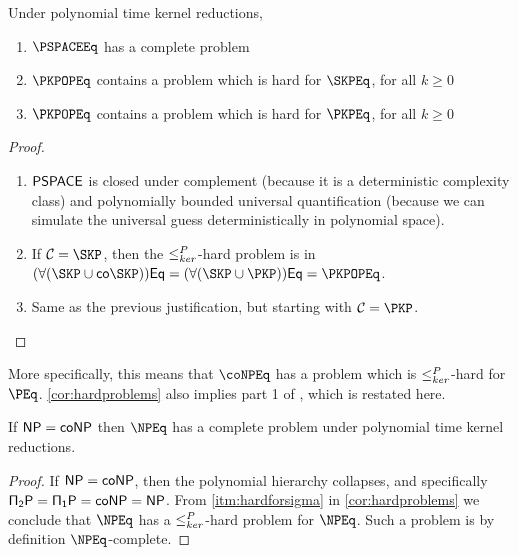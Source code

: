 \begin{corollary}\label{cor:hardproblems}
  Under polynomial time kernel reductions,
  \begin{enumerate}
  \item $\PSPACEEq$ has a complete problem
  \item\label{itm:hardforsigma} $\PKPOPEq$ contains a problem which is hard for $\SKPEq$, for all $k\geq 0$
  \item $\PKPOPEq$ contains a problem which is hard for $\PKPEq$, for all $k\geq 0$
  \end{enumerate}
\end{corollary}
\begin{proof}\mbox{}
  \begin{enumerate}
  \item ${\mathsf{PSPACE}}$ is closed under complement (because it is a deterministic complexity class) and polynomially bounded universal quantification (because we can simulate the universal guess deterministically in polynomial space).
  \item If $\mathcal{C}=\SKP$, then the $\leq^{P}_{ker}$-hard problem is in $(\forall(\SKP\cup\mathsf{co}\SKP))\mathsf{Eq}=(\forall(\SKP\cup\PKP))\mathsf{Eq}=\PKPOPEq$.
  \item Same as the previous justification, but starting with $\mathcal{C}=\PKP$.\qedhere
  \end{enumerate}
\end{proof}

More specifically, this means that $\coNPEq$ has a problem which is $\leq^{P}_{ker}$-hard for $\PEq$.
\autoref{cor:hardproblems} also implies part 1 of \cite[Theorem~8.7]{bcffm}, which is restated here.

\begin{corollary}
  If ${\mathsf{NP}}={\mathsf{coNP}}$ then $\NPEq$ has a complete problem under polynomial time kernel reductions.
\end{corollary}
\begin{proof}
  If ${\mathsf{NP}}={\mathsf{coNP}}$, then the polynomial hierarchy collapses, and specifically $\mathsf{\Pi_2P}=\mathsf{\Pi_1P}={\mathsf{coNP}}={\mathsf{NP}}$.
  From \autoref{itm:hardforsigma} in \autoref{cor:hardproblems} we conclude that $\NPEq$ has a $\leq^{P}_{ker}$-hard problem for $\NPEq$.
  Such a problem is by definition $\NPEq$-complete.
\end{proof}

